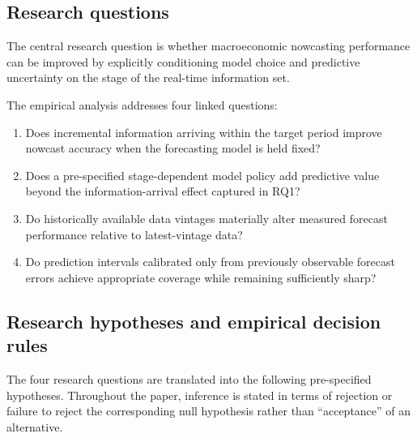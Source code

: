 \subsection{Research questions}
\label{subsec:research_questions}

The central research question is whether macroeconomic nowcasting performance can be improved by explicitly conditioning model choice and predictive uncertainty on the stage of the real-time information set.

The empirical analysis addresses four linked questions:
\begin{enumerate}[label=\textbf{RQ\arabic*:}, leftmargin=*]
    \item Does incremental information arriving within the target period improve nowcast accuracy when the forecasting model is held fixed?
    \item Does a pre-specified stage-dependent model policy add predictive value beyond the information-arrival effect captured in RQ1?
    \item Do historically available data vintages materially alter measured forecast performance relative to latest-vintage data?
    \item Do prediction intervals calibrated only from previously observable forecast errors achieve appropriate coverage while remaining sufficiently sharp?
\end{enumerate}

\subsection{Research hypotheses and empirical decision rules}
\label{subsec:hypotheses}

The four research questions are translated into the following pre-specified hypotheses. Throughout the paper, inference is stated in terms of rejection or failure to reject the corresponding null hypothesis rather than ``acceptance'' of an alternative.

